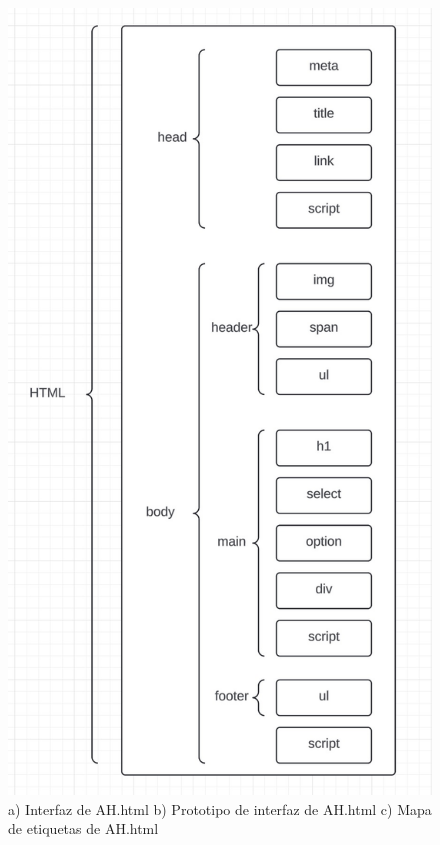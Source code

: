 \documentclass{article}
\begin{document}
\begin{figure}[H]
    \vspace{5mm}
    
    \includegraphics[width=\textwidth, height=0.4\textheight, keepaspectratio]{htmlFotos/MEmapa.jpg}
    \caption{a) Interfaz de AH.html b) Prototipo de interfaz de AH.html c) Mapa de etiquetas de AH.html}
    \label{fig:imagenes_conjuntas}
\end{figure}
\end{document}
